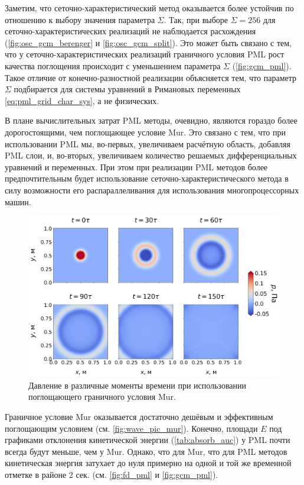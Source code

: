 Заметим, что сеточно-характеристический метод оказывается более устойчив по отношению к выбору значения параметра $\Sigma$. Так, при выборе $\Sigma=256$ для сеточно-характерис\-тических реализаций не наблюдается расхождения (\autoref{fig:osc_gcm_berenger} и \autoref{fig:osc_gcm_split}). Это может быть связано с тем, что у сеточно-характеристических реализаций граничного условия PML рост качества поглощения происходит с уменьшением параметра $\Sigma$ (\autoref{fig:gcm_pml}). Такое отличие от конечно-разностной реализации объясняется тем, что параметр $\Sigma$ подбирается для системы уравнений в Римановых переменных \eqref{eq:pml_grid_char_sys}, а не физических.

В плане вычислительных затрат PML методы, очевидно, являются гораздо более дорогостоящими, чем поглощающее условие Mur. Это связано с тем, что при использовании PML мы, во-первых, увеличиваем расчётную область, добавляя PML слои, и, во-вторых, увеличиваем количество  решаемых дифференциальных уравнений и переменных. При этом при реализации PML методов более предпочтительным будет использование сеточно-характеристического метода в силу возможности его распараллеливания для использования многопроцессорных машин.

\begin{figure}[htb]
    \centering
    \includegraphics[width=1.0\textwidth]{images/pml/wave_pic_mur.png}
    \caption{Давление в различные моменты времени при использовании поглощающего граничного условия Mur.}
    \label{fig:wave_pic_mur}
\end{figure}

Граничное условие Mur оказывается достаточно дешёвым и эффективным поглощающим условием (см. \autoref{fig:wave_pic_mur}). Конечно, площади $E$ под графиками отклонения кинетической энергии (\autoref{tab:absorb_auc}) у PML почти всегда будут меньше, чем у Mur. Однако, что для Mur, что для PML методов кинетическая энергия затухает до нуля примерно на одной и той же временной отметке в районе 2 сек. (см. \autoref{fig:fd_pml} и \ref{fig:gcm_pml}).

